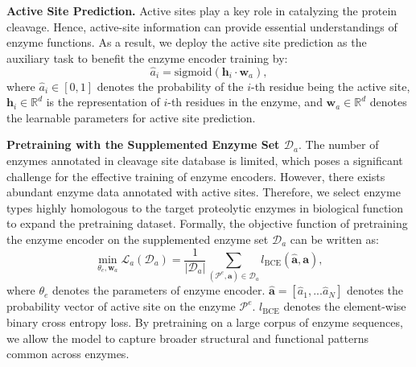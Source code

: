 \textbf{Active Site Prediction.} 
Active sites play a key role in catalyzing the protein cleavage. Hence, active-site information can provide essential understandings of enzyme functions. As a result, we deploy the active site prediction as the auxiliary task to benefit the enzyme encoder training by:
\begin{equation}
    {\hat a}_i =  \mathrm{sigmoid}(\mathbf{h}_i \cdot \mathbf{w}_a ),
    \label{eq:actsite_prediction}
\end{equation}
where ${\hat a}_i \in [0,1]$ denotes the probability of the $i$-th residue being the active site, $\mathbf{h}_i \in \mathbb{R}^{d}$ is the representation  of $i$-th residues in the enzyme, and $\mathbf{w}_a \in \mathbb{R}^{d}$ denotes the learnable parameters for active site prediction. 


\textbf{Pretraining with the Supplemented Enzyme Set $\mathcal{D}_a$}. The number of enzymes annotated in cleavage site database is limited, which poses a significant challenge for the effective training of enzyme encoders\cite{dai2023unifiedframeworkgraphinformation}. However, there exists abundant enzyme data annotated with active sites. Therefore, we select enzyme types highly homologous to the target proteolytic enzymes in biological function to expand the pretraining dataset. Formally, the objective function of pretraining the enzyme encoder on the supplemented enzyme set $\mathcal{D}_a$ can be written as:
\begin{equation}
    \min_{\theta_e, \mathbf{w}_a} \mathcal{L}_a(\mathcal{D}_a)=\frac{1}{|\mathcal{D}_a|} \sum_{(\mathcal{P}^e,\mathbf{a}) \in \mathcal{D}_a} l_{\mathrm{BCE}}(\hat{\mathbf a}, \mathbf{a}), 
    \label{eq:activate loss}
\end{equation}
where $\theta_e$ denotes the parameters of enzyme encoder. $\mathbf{\hat a} = [\hat{a}_1,...\hat{a}_N]$ denotes the probability vector of active site on the enzyme $\mathcal{P}^e$. $l_{\mathrm{BCE}}$ denotes the element-wise binary cross entropy loss.
By pretraining on a large corpus of enzyme sequences, we allow the model to capture broader structural and functional patterns common across enzymes.

